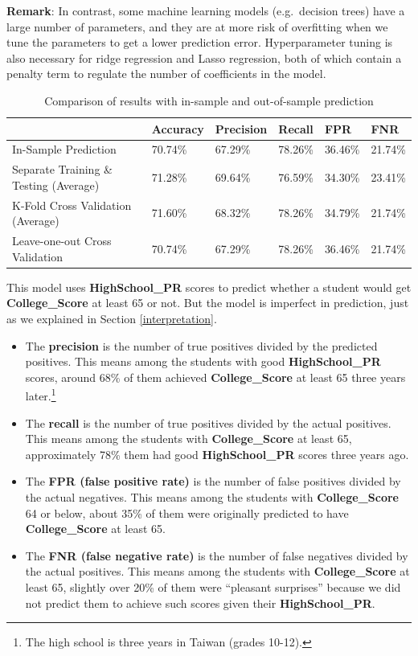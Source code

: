 \documentclass[
]{article}
\begin{document}
\textbf{Remark}: In contrast, some machine learning models
(e.g.~decision trees) have a large number of parameters, and they are at
more risk of overfitting when we tune the parameters to get a lower
prediction error. Hyperparameter tuning is also necessary for ridge
regression and Lasso regression, both of which contain a penalty term to
regulate the number of coefficients in the model.

\begin{table}[ht]
    \centering
    \begin{tabular}{|l|l|l|l|l|l|}
    \hline
    ~                              & Accuracy & Precision & Recall  & FPR     & FNR     \\ \hline
    In-Sample Prediction           & 70.74\%  & 67.29\%   & 78.26\% & 36.46\% & 21.74\% \\ \hline
    Separate Training \& Testing (Average)  & 71.28\%  & 69.64\%   & 76.59\% & 34.30\% & 23.41\% \\ \hline
    K-Fold Cross Validation (Average)       & 71.60\%  & 68.32\%   & 78.26\% & 34.79\% & 21.74\% \\ \hline
    Leave-one-out Cross Validation & 70.74\%  & 67.29\%   & 78.26\% & 36.46\% & 21.74\% \\ \hline
    \end{tabular}
    \caption{Comparison of results with in-sample and out-of-sample prediction}
    \label{tab:out-train-test}
\end{table}

This model uses \textbf{HighSchool\_PR} scores to predict whether a
student would get \textbf{College\_Score} at least 65 or not. But the
model is imperfect in prediction, just as we explained in Section
\ref{interpretation}.

\begin{itemize}
\item
  The \textbf{precision} is the number of true positives divided by the
  predicted positives. This means among the students with good
  \textbf{HighSchool\_PR} scores, around 68\% of them achieved
  \textbf{College\_Score} at least 65 three years
  later.\footnote{The high school is three years in Taiwan (grades 10-12).}
\item
  The \textbf{recall} is the number of true positives divided by the
  actual positives. This means among the students with
  \textbf{College\_Score} at least 65, approximately 78\% them had good
  \textbf{HighSchool\_PR} scores three years ago.
\item
  The \textbf{FPR (false positive rate)} is the number of false
  positives divided by the actual negatives. This means among the
  students with \textbf{College\_Score} 64 or below, about 35\% of them
  were originally predicted to have \textbf{College\_Score} at least 65.
\item
  The \textbf{FNR (false negative rate)} is the number of false
  negatives divided by the actual positives. This means among the
  students with \textbf{College\_Score} at least 65, slightly over 20\%
  of them were ``pleasant surprises'' because we did not predict them to
  achieve such scores given their \textbf{HighSchool\_PR}.
\end{itemize}
\end{document}
